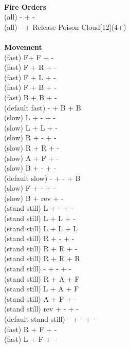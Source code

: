 \ \\ {\bf Fire Orders } \\
(all) - + -  \\
(all) - + Release Poison Cloud[12](4+) \\
\ \\ {\bf Movement } \\
(fast) F+ F + - \\
(fast) F + R + - \\
(fast) F + L + - \\
(fast) F + B + - \\
(fast) B + B + - \\
(default fast) - + B + B \\
(slow) L + - + - \\
(slow) L + L + - \\
(slow) R + - + - \\
(slow) R + R + - \\
(slow) A + F + - \\
(slow) B + - + - \\
(default slow) - + - + B \\
(slow) F + - + - \\
(slow) B + rev + - \\
(stand still) L + - + - \\
(stand still) L + L + - \\
(stand still) L + L + L \\
(stand still) R + - + - \\
(stand still) R + R + - \\
(stand still) R + R + R \\
(stand still) - + - + - \\
(stand still) R + A + F \\
(stand still) L + A + F \\
(stand still) A + F + - \\
(stand still) rev + - + - \\
(default stand still) - + - + - \\
(fast) R + F + - \\
(fast) L + F + - \\



